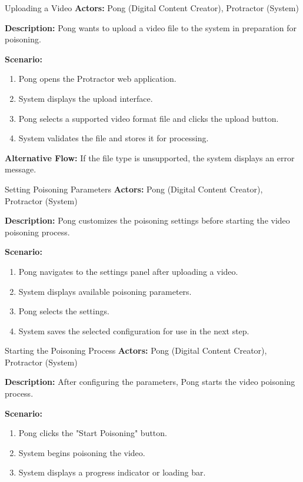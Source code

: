 \begin{usecase}{Uploading a Video}
    \textbf{Actors:} Pong (Digital Content Creator), Protractor (System)

    \textbf{Description:} Pong wants to upload a video file to the system in preparation for poisoning.

    \textbf{Scenario:}
    \begin{enumerate}[leftmargin=80pt]
        \item Pong opens the Protractor web application.
        \item System displays the upload interface.
        \item Pong selects a supported video format file and clicks the upload button.
        \item System validates the file and stores it for processing.
    \end{enumerate}
    \textbf{Alternative Flow:} If the file type is unsupported, the system displays an error message.
\end{usecase}

\begin{usecase}{Setting Poisoning Parameters}
    \textbf{Actors:} Pong (Digital Content Creator), Protractor (System)

    \textbf{Description:} Pong customizes the poisoning settings before starting the video poisoning process.

    \textbf{Scenario:}
    \begin{enumerate}[leftmargin=80pt]
        \item Pong navigates to the settings panel after uploading a video.
        \item System displays available poisoning parameters.
        \item Pong selects the settings.
        \item System saves the selected configuration for use in the next step.
    \end{enumerate}
\end{usecase}

\begin{usecase}{Starting the Poisoning Process}
    \textbf{Actors:} Pong (Digital Content Creator), Protractor (System)

    \textbf{Description:} After configuring the parameters, Pong starts the video poisoning process.

    \textbf{Scenario:}
    \begin{enumerate}[leftmargin=80pt]
        \item Pong clicks the "Start Poisoning" button.
        \item System begins poisoning the video.
        \item System displays a progress indicator or loading bar.
    \end{enumerate}
\end{usecase}

